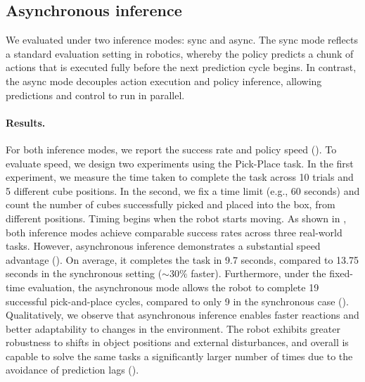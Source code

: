 


% 



\subsection{Asynchronous inference}

We evaluated \ours{} under two inference modes: sync and async. 
The sync mode reflects a standard evaluation setting in robotics, whereby the policy predicts a chunk of actions that is executed fully before the next prediction cycle begins. In contrast, the async mode decouples action execution and policy inference, allowing predictions and control to run in parallel.

\paragraph{Results.}
For both inference modes, we report the success rate and policy speed (). To evaluate speed, we design two experiments using the Pick-Place task. In the first experiment, we measure the time taken to complete the task across 10 trials and 5 different cube positions. In the second, we fix a time limit (e.g., 60 seconds) and count the number of cubes successfully picked and placed into the box, from different positions. Timing begins when the robot starts moving. As shown in , both inference modes achieve comparable success rates across three real-world tasks. However, asynchronous inference demonstrates a substantial speed advantage (). On average, it completes the task in 9.7 seconds, compared to 13.75 seconds in the synchronous setting (\( \sim 30\% \) faster). Furthermore, under the fixed-time evaluation, the asynchronous mode allows the robot to complete 19 successful pick-and-place cycles, compared to only 9 in the synchronous case (). Qualitatively, we observe that asynchronous inference enables faster reactions and better adaptability to changes in the environment. The robot exhibits greater robustness to shifts in object positions and external disturbances, and overall is capable to solve the same tasks a significantly larger number of times due to the avoidance of prediction lags ().

